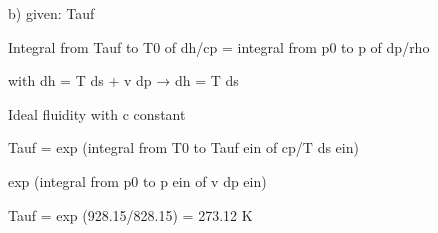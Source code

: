 b) given: Tauf

Integral from Tauf to T0 of dh/cp = integral from p0 to p of dp/rho

with dh = T ds + v dp  → dh = T ds

Ideal fluidity with c constant

Tauf = exp (integral from T0 to Tauf ein of cp/T ds ein)

exp (integral from p0 to p ein of v dp ein)

Tauf = exp (928.15/828.15) = 273.12 K